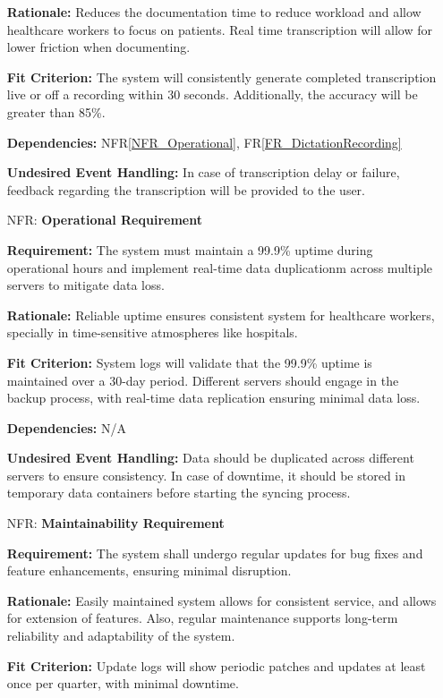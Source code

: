 \documentclass[12pt]{article}
\newcounter{nfrnum} %
\begin{document}
\begin{itemize}
    \textbf{Rationale:} Reduces the documentation time to reduce workload and allow healthcare workers to focus on patients. Real time transcription will allow for lower friction when documenting.
    
    \textbf{Fit Criterion:} The system will consistently generate completed transcription live or off a recording within 30 seconds. Additionally, the accuracy will be greater than 85\%.

    \textbf{Dependencies:} NFR\ref{NFR_Operational}, FR\ref{FR_DictationRecording}

    \textbf{Undesired Event Handling:} In case of transcription delay or failure, feedback regarding the transcription will be provided to the user.

\item[NFR\refstepcounter{nfrnum}\thenfrnum \label{NFR_Operational}:] \textbf{Operational Requirement}

    \textbf{Requirement:} The system must maintain a 99.9\% uptime during operational hours and implement real-time data duplicationm across multiple servers to mitigate data loss.

    \textbf{Rationale:} Reliable uptime ensures consistent system for healthcare workers, specially in time-sensitive atmospheres like hospitals.

    \textbf{Fit Criterion:} System logs will validate that the 99.9\% uptime is maintained over a 30-day period. Different servers should engage in the backup process, with real-time data replication ensuring minimal data loss. 

    \textbf{Dependencies:} N/A
    
    \textbf{Undesired Event Handling:} Data should be duplicated across different servers to ensure consistency. In case of downtime, it should be stored in temporary data containers before starting the syncing process.

\item[NFR\refstepcounter{nfrnum}\thenfrnum \label{NFR_Maintainability}:] \textbf{Maintainability Requirement}

    \textbf{Requirement:} The system shall undergo regular updates for bug fixes and feature enhancements, ensuring minimal disruption.

    \textbf{Rationale:} Easily maintained system allows for consistent service, and allows for extension of features. Also, regular maintenance supports long-term reliability and adaptability of the system.

    \textbf{Fit Criterion:} Update logs will show periodic patches and updates at least once per quarter, with minimal downtime.


\end{itemize}
\end{document}
